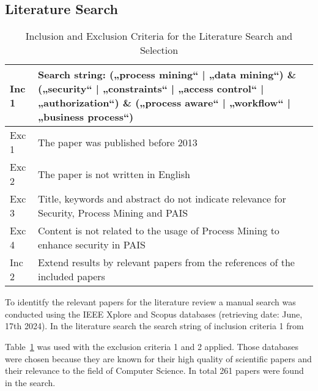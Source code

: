 \documentclass[runningheads]{llncs}
\begin{document}
\subsection{Literature Search}\label{Search}
\begin{table}[h!]
    \centering
    \begin{tabular}{ | m{1cm} | m{11cm} | }
        \hline
        Inc 1 & Search string: („process mining“ | „data mining“) \& („security“ | „constraints“ | „access control“ | „authorization“) \& („process aware“ | „workflow“ | „business process“) \\
        \hline
        Exc 1 & The paper was published before 2013                                                                                                                                           \\
        \hline
        Exc 2 & The paper is not written in English                                                                                                                                           \\
        \hline
        Exc 3 & Title, keywords and abstract do not indicate relevance for Security, Process Mining and PAIS                                                                                  \\
        \hline
        Exc 4 & Content is not related to the usage of Process Mining to enhance security in PAIS                                                                                             \\
        \hline
        Inc 2 & Extend results by relevant papers from the references of the included papers                                                                                                  \\
        \hline
    \end{tabular}
    \caption{Inclusion and Exclusion Criteria for the Literature Search and Selection}
    \label{criteria}
\end{table}
To identitfy the relevant papers for the literature review a manual search was conducted using the IEEE Xplore and Scopus databases (retrieving date: June, 17th 2024). In the literature search the search string of inclusion criteria 1 from

Table~\ref{criteria} was used with the exclusion criteria 1 and 2 applied. Those databases were chosen because they are known for their high quality of scientific papers and their relevance to the field of Computer Science. In total 261 papers were found in the search.
\end{document}
